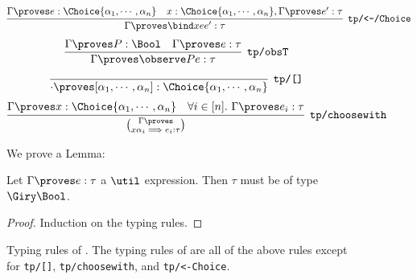 \begin{figure}[H]
\begin{mdframed}
{\begin{align*}
    \end{align*}
    \begin{align*}
      \infer[\texttt{tp/<-/Choice}]
        {\Gamma \proves \bind x e {e'} : \tau}
        {\Gamma \proves e : \Choice{\alpha_1, \cdots, \alpha_n}
        & x : \Choice{\alpha_1, \cdots, \alpha_n}, \Gamma \proves e' : \tau}
    \end{align*}
    \begin{align*}
      \infer[\texttt{tp/obsT}]
        {\Gamma \proves \observe P e : \tau}
        {\Gamma \proves P : \Bool
        & \Gamma \proves e : \tau}
    \end{align*}
    \begin{align*}
    \infer[\texttt{tp/[]}]
      {\cdot \proves [\alpha_1, \cdots, \alpha_n] :
        \Choice{\alpha_1, \cdots, \alpha_n}}
      {}
    \end{align*}
    \begin{align*}
    \infer[\texttt{tp/choosewith}]
      {\Gamma \proves \choose{x}{\alpha_i \implies e_i} : \tau}
      {\Gamma \proves x : \Choice{\alpha_1,\cdots, \alpha_n}
      &\forall i \in [n]. \ \Gamma \proves e_i : \tau}
    \end{align*}}
\end{mdframed}
\caption{Typing rules of \dappl{}.
The typing rules of \util{} are all of the above
rules except for \texttt{tp/[]}, \texttt{tp/choosewith}, and \texttt{tp/<-Choice}.
}
\label{fig:dappl typing}

We prove a Lemma:

\begin{lemma}
  Let $\Gamma \proves e : \tau$ a $\util$ expression. Then $\tau$ must be of type $\Giry \Bool$.
\end{lemma}

\begin{proof}
  Induction on the typing rules.
\end{proof}
\end{figure}
